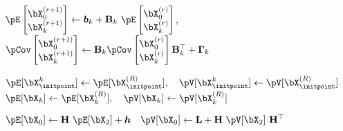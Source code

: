 \begin{algorithm}[h]
\begin{algorithmic}[1]
                \STATE $\pE\begin{bmatrix}\bX_0^{(r+1)}\\\bX_k^{(r+1)}\end{bmatrix}
                \gets
                \boldsymbol{b}_k
                + 
                \mathbf{B}_k \ \pE\begin{bmatrix}\bX_0^{(r)}\\\bX_k^{(r)}\end{bmatrix}$,
                \qquad
                $\pCov\begin{bmatrix}\bX_0^{(r+1)}\\\bX_k^{(r+1)}\end{bmatrix}
                \gets 
                \mathbf{B}_k \pCov\begin{bmatrix}\bX_0^{(r)}\\\bX_k^{(r)}\end{bmatrix} \mathbf{B}_k^\top + \mathbf{\Gamma}_k$
                
            \ENDFOR
            \STATE $\pE[\bX_{\initpoint}^k] \gets \pE[\bX^{(R)}_{\initpoint}],
            \quad
            \pV[\bX_{\initpoint}^k] \gets \pV[\bX^{(R)}_{\initpoint}]$
            \STATE $\pE[\bX_k] \gets \pE[\bX^{(R)}_k],
            \quad
            \pV[\bX_k] \gets \pV[\bX^{(R)}_k]$
        \ENDFOR

        \STATE $\pE[\bX_0] \gets \LH \ \pE[\bX_2] + \Lbias
        \quad
        \pV[\bX_0] \gets \Lcov + \LH \ \pV[\bX_2] \ \LH^\top$
    \end{algorithmic}
\end{algorithm}



